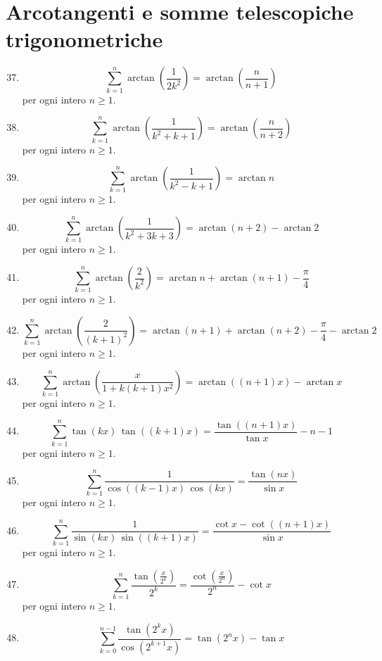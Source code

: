 \documentclass[11pt,a4paper]{article}
\begin{document}
\section*{Arcotangenti e somme telescopiche trigonometriche}
\begin{enumerate}
\setcounter{enumi}{36}
\item \[ \sum_{k=1}^{n} \arctan\left(\frac{1}{2k^{2}}\right) = \arctan\left(\frac{n}{n + 1}\right) \]
{\small per ogni intero $n\ge 1$.}
\item \[ \sum_{k=1}^{n} \arctan\left(\frac{1}{k^{2} + k + 1}\right) = \arctan\left(\frac{n}{n + 2}\right) \]
{\small per ogni intero $n\ge 1$.}
\item \[ \sum_{k=1}^{n} \arctan\left(\frac{1}{k^{2} - k + 1}\right) = \arctan n \]
{\small per ogni intero $n\ge 1$.}
\item \[ \sum_{k=1}^{n} \arctan\left(\frac{1}{k^{2} + 3k + 3}\right) = \arctan\left(n + 2\right) - \arctan 2 \]
{\small per ogni intero $n\ge 1$.}
\item \[ \sum_{k=1}^{n} \arctan\left(\frac{2}{k^{2}}\right) = \arctan n + \arctan\left(n + 1\right) - \frac{\pi}{4} \]
{\small per ogni intero $n\ge 1$.}
\item \[ \sum_{k=1}^{n} \arctan\left(\frac{2}{\left(k + 1\right)^{2}}\right) = \arctan\left(n + 1\right) + \arctan\left(n + 2\right) - \frac{\pi}{4} - \arctan 2 \]
{\small per ogni intero $n\ge 1$.}
\item \[ \sum_{k=1}^{n} \arctan\left(\frac{x}{1 + k\left(k + 1\right)x^{2}}\right) = \arctan\left(\left(n + 1\right)x\right) - \arctan x \]
{\small per ogni intero $n\ge 1$.}
\item \[ \sum_{k=1}^{n} \tan\left(k x\right)\,\tan\left(\left(k + 1\right)x\right) = \frac{\tan\left(\left(n + 1\right)x\right)}{\tan x} - n - 1 \]
{\small per ogni intero $n\ge 1$.}
\item \[ \sum_{k=1}^{n} \frac{1}{\cos\left(\left(k - 1\right)x\right)\,\cos\left(k x\right)} = \frac{\tan\left(n x\right)}{\sin x} \]
{\small per ogni intero $n\ge 1$.}
\item \[ \sum_{k=1}^{n} \frac{1}{\sin\left(k x\right)\,\sin\left(\left(k + 1\right)x\right)} = \frac{\cot x - \cot\left(\left(n + 1\right)x\right)}{\sin x} \]
{\small per ogni intero $n\ge 1$.}
\item \[ \sum_{k=1}^{n} \frac{\tan\left(\frac{x}{2^{k}}\right)}{2^{k}} = \frac{\cot\left(\frac{x}{2^{n}}\right)}{2^{n}} - \cot x \]
{\small per ogni intero $n\ge 1$.}
\item \[ \sum_{k=0}^{n - 1} \frac{\tan\left(2^{k}x\right)}{\cos\left(2^{k + 1}x\right)} = \tan\left(2^{n}x\right) - \tan x \]

\end{enumerate}
\end{document}
